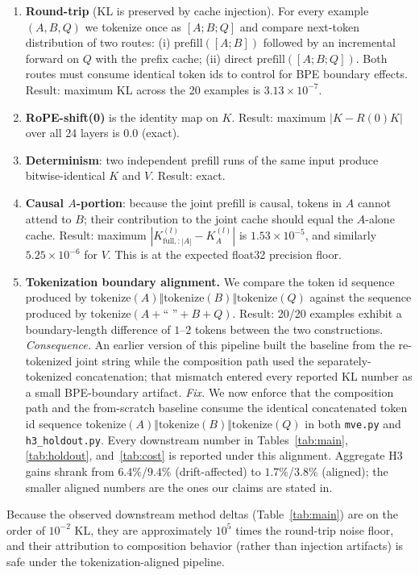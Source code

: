 \begin{enumerate}[leftmargin=*]
    \item \textbf{Round-trip} (KL is preserved by cache injection). For every example $(A, B, Q)$ we tokenize once as $[A; B; Q]$ and compare next-token distribution of two routes: (i) $\mathrm{prefill}([A;B])$ followed by an incremental forward on $Q$ with the prefix cache; (ii) direct $\mathrm{prefill}([A;B;Q])$. Both routes must consume identical token ids to control for BPE boundary effects.
    Result: maximum KL across the 20 examples is $3.13\times10^{-7}$.
    \item \textbf{RoPE-shift(0)} is the identity map on $K$. Result: maximum $|K - R(0)K|$ over all 24 layers is $0.0$ (exact).
    \item \textbf{Determinism}: two independent prefill runs of the same input produce bitwise-identical $K$ and $V$. Result: exact.
    \item \textbf{Causal $A$-portion}: because the joint prefill is causal, tokens in $A$ cannot attend to $B$; their contribution to the joint cache should equal the $A$-alone cache. Result: maximum $|K^{(l)}_{\text{full}, :|A|} - K^{(l)}_A|$ is $1.53\times10^{-5}$, and similarly $5.25\times10^{-6}$ for $V$. This is at the expected float32 precision floor.
    \item \textbf{Tokenization boundary alignment.} We compare the token id sequence produced by $\mathrm{tokenize}(A) \Vert \mathrm{tokenize}(B) \Vert \mathrm{tokenize}(Q)$ against the sequence produced by $\mathrm{tokenize}(A + \text{`` ''} + B + Q)$. Result: 20/20 examples exhibit a boundary-length difference of $1$--$2$ tokens between the two constructions. \emph{Consequence.} An earlier version of this pipeline built the baseline from the re-tokenized joint string while the composition path used the separately-tokenized concatenation; that mismatch entered every reported KL number as a small BPE-boundary artifact. \emph{Fix.} We now enforce that the composition path and the from-scratch baseline consume the identical concatenated token id sequence $\mathrm{tokenize}(A) \Vert \mathrm{tokenize}(B) \Vert \mathrm{tokenize}(Q)$ in both \texttt{mve.py} and \texttt{h3\_holdout.py}. Every downstream number in Tables~\ref{tab:main}, \ref{tab:holdout}, and~\ref{tab:cost} is reported under this alignment. Aggregate H3 gains shrank from $6.4\%$/$9.4\%$ (drift-affected) to $1.7\%$/$3.8\%$ (aligned); the smaller aligned numbers are the ones our claims are stated in.
\end{enumerate}

Because the observed downstream method deltas (Table~\ref{tab:main}) are on the order of $10^{-2}$ KL, they are approximately $10^5$ times the round-trip noise floor, and their attribution to composition behavior (rather than injection artifacts) is safe under the tokenization-aligned pipeline.


